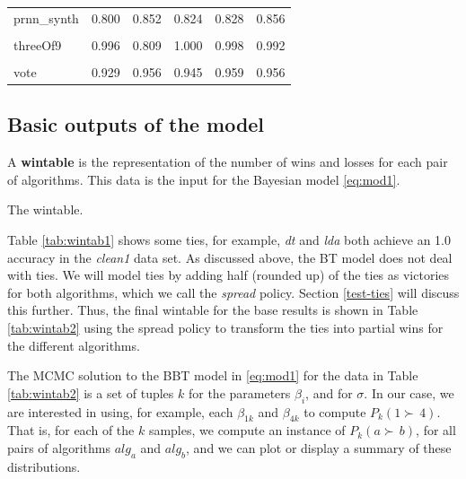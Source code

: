 \documentclass[twoside,11pt,preprint]{article}
\begin{document}
\begin{table}
\begin{tabular}[t]{lrrrrr}
\addlinespace
prnn\_synth & 0.800 & 0.852 & 0.824 & 0.828 & 0.856\\
\cellcolor{gray!6}{saheart} & \cellcolor{gray!6}{0.626} & \cellcolor{gray!6}{0.723} & \cellcolor{gray!6}{0.660} & \cellcolor{gray!6}{0.671} & \cellcolor{gray!6}{0.712}\\
threeOf9 & 0.996 & 0.809 & 1.000 & 0.998 & 0.992\\
\cellcolor{gray!6}{tokyo1} & \cellcolor{gray!6}{0.902} & \cellcolor{gray!6}{0.920} & \cellcolor{gray!6}{0.928} & \cellcolor{gray!6}{0.926} & \cellcolor{gray!6}{0.931}\\
vote & 0.929 & 0.956 & 0.945 & 0.959 & 0.956\\
\bottomrule
\end{tabular}
\end{table}

\hypertarget{basic-outputs-of-the-model}{%
\subsection{\texorpdfstring{Basic outputs of the model \label{sec:out1}}{Basic outputs of the model }}\label{basic-outputs-of-the-model}}

A \textbf{wintable} is the representation of the number of wins and losses for each pair of algorithms.
This data is the input for the Bayesian model \ref{eq:mod1}.

\begin{table}[ht]
\centering
{}\quad
{}
\caption{The wintable.}
\end{table}

Table \ref{tab:wintab1} shows some ties, for example, \emph{dt} and \emph{lda}
both achieve an 1.0 accuracy in the \emph{clean1} data set. As discussed above,
the BT model does not deal with ties. We will model ties by adding
half (rounded up) of the ties as victories for both algorithms,
which we call the \emph{spread} policy. Section \ref{test-ties}
will discuss this further. Thus, the final wintable for the base
results is shown in Table \ref{tab:wintab2} using the spread policy to
transform the ties into partial wins for the different algorithms.

The MCMC solution to the BBT model in \ref{eq:mod1} for the data in
Table \ref{tab:wintab2} is a set of tuples \(k\) for the parameters
\(\beta_{i}\), and for \(\sigma\). In our case, we are interested in
using, for example, each \(\beta_{1k}\) and \(\beta_{4k}\) to compute
\(P_k(1 \succ\,4)\). That is, for each of the \(k\) samples, we compute
an instance of \(P_k(a \succ\,b)\), for all pairs of algorithms \(alg_a\)
and \(alg_b\), and we can plot or display a summary of these
distributions.
\end{document}
